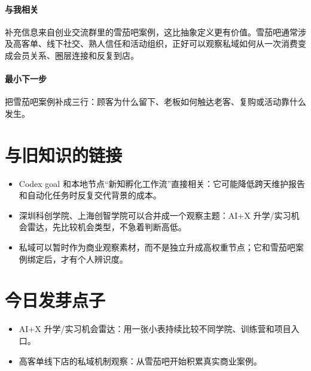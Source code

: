 \documentclass[UTF8,zihao=-4]{ctexart}
\begin{document}
\paragraph{与我相关} 补充信息来自创业交流群里的雪茄吧案例，这比抽象定义更有价值。雪茄吧通常涉及高客单、线下社交、熟人信任和活动组织，正好可以观察私域如何从一次消费变成会员关系、圈层连接和反复到店。
\paragraph{最小下一步} 把雪茄吧案例补成三行：顾客为什么留下、老板如何触达老客、复购或活动靠什么发生。
\section*{与旧知识的链接}
\begin{itemize}[leftmargin=2em]
\item Codex goal 和本地节点“新知孵化工作流”直接相关：它可能降低跨天维护报告和自动化任务时反复交代背景的成本。
\item 深圳科创学院、上海创智学院可以合并成一个观察主题：AI+X 升学/实习机会雷达，先比较机会类型，不急着判断高低。
\item 私域可以暂时作为商业观察素材，而不是独立升成高权重节点；它和雪茄吧案例绑定后，才有个人辨识度。
\end{itemize}
\section*{今日发芽点子}
\begin{itemize}[leftmargin=2em]
\item AI+X 升学/实习机会雷达：用一张小表持续比较不同学院、训练营和项目入口。
\item 高客单线下店的私域机制观察：从雪茄吧开始积累真实商业案例。
\end{itemize}
\end{document}
